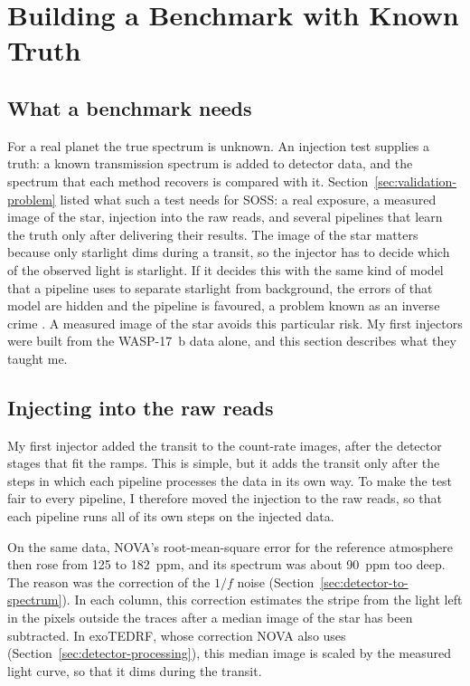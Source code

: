 \section{Building a Benchmark with Known Truth}
\label{sec:benchmark}

\subsection{What a benchmark needs}
\label{sec:benchmark-needs}

For a real planet the true spectrum is unknown. An injection test supplies a
truth: a known transmission spectrum is added to detector data, and the
spectrum that each method recovers is compared with it.
Section~\ref{sec:validation-problem} listed what such a test needs for SOSS: a
real exposure, a measured image of the star, injection into the raw reads,
and several pipelines that learn the truth only after delivering their
results. The image of the star matters because only starlight dims during a
transit, so the injector has to decide which of the observed light is
starlight. If it decides this with the same kind of model that a pipeline uses
to separate starlight from background, the errors of that model are hidden and
the pipeline is favoured, a problem known as an inverse crime
\citep{KaipioSomersalo2007}. A measured image of the star avoids this
particular risk. My first
injectors were built from the WASP-17~b data alone, and this section describes
what they taught me.

\subsection{Injecting into the raw reads}
\label{sec:raw-injection}

My first injector added the transit to the count-rate images, after the
detector stages that fit the ramps. This is simple, but it adds the transit
only after the steps in which each pipeline processes the data in its own
way. To make the test fair to every pipeline, I therefore moved the injection
to the raw reads, so that each pipeline runs all of its own steps on the
injected data.

On the same data, NOVA's root-mean-square error for the reference atmosphere
then rose from 125 to 182~ppm, and its spectrum was about 90~ppm too deep. The
reason was the correction of the $1/f$ noise
(Section~\ref{sec:detector-to-spectrum}). In each column, this correction
estimates the stripe from the light left in the pixels outside the traces
after a median image of the star has been subtracted. In exoTEDRF, whose
correction NOVA also uses (Section~\ref{sec:detector-processing}), this
median image is scaled by the measured light curve, so that it dims during the
transit.

